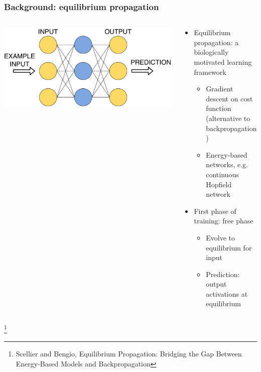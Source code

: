 \documentclass[pdf]{beamer}
\newcommand\blfootnote[1]{%
\begingroup
\renewcommand\thefootnote{}\footnote{#1}%
\addtocounter{footnote}{-1}%
\endgroup
}
\begin{document}
\begin{frame}
\frametitle{Background: equilibrium propagation}
\begin{columns}
	\begin{column}{.5\textwidth}
		\includegraphics[width=\textwidth]{figures/eqp_free_illustration.pdf}
	\end{column}
	\begin{column}{.5\textwidth}
		\begin{itemize}
			\item<1-> Equilibrium propagation: a biologically motivated learning framework
			\begin{itemize}
				\item<2-> Gradient descent on cost function (alternative to backpropagation)
				\item<3-> Energy-based networks, e.g. continuous Hopfield network
			\end{itemize}
			\item<4-> First phase of training: free phase
			\begin{itemize}
				\item<5-> Evolve to equilibrium for input
				\item<6-> Prediction: output activations at equilibrium
			\end{itemize}
		\end{itemize}
	\end{column}
\end{columns}
\blfootnote{Scellier and Bengio, Equilibrium Propagation: Bridging the Gap Between Energy-Based Models and Backpropagation}
\end{frame}
\end{document}
